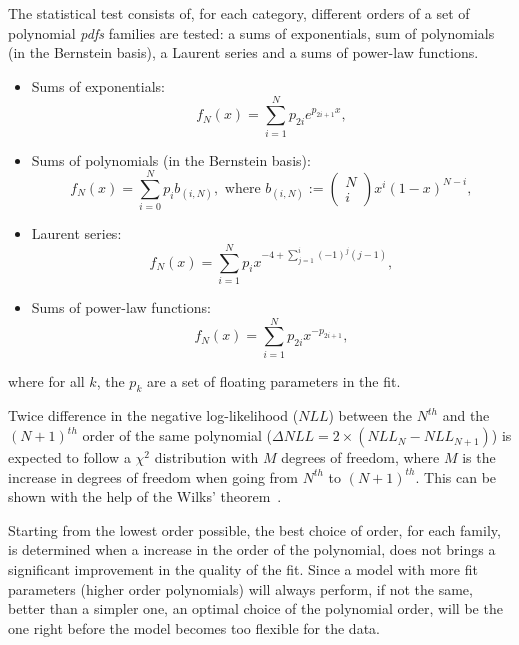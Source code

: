 The statistical test consists of, for each category, different orders of a set of polynomial \textit{pdfs} families are tested: a sums of exponentials, sum of polynomials (in the Bernstein basis), a Laurent series and a sums of power-law functions. 


\begin{itemize}
\item Sums of exponentials: $$ f_{N}(x)= \sum^{N}_{i=1} p_{2i} e^{p_{2i+1} x} ,$$
\item Sums of polynomials (in the Bernstein basis): $$ f_{N}(x) = \sum^{N}_{i=0} p_{i} b_{(i,N)}, \text{ where } b_{(i,N)}:= \begin{pmatrix} N \\ i \end{pmatrix} x^i (1-x)^{N-i} ,$$
\item Laurent series: $$ f_{N}(x)= \sum^{N}_{i=1} p_{i} x^{-4 + \sum^{i}_{j=1} (-1)^{j} (j-1)},$$
\item Sums of power-law functions: $$ f_{N}(x)= \sum^{N}_{i=1} p_{2i} x^{-p_{2i+1}},$$
\end{itemize}
where for all $k$, the $p_k$ are a set of floating parameters in the fit.

Twice difference in the negative log-likelihood ($NLL$) between the $N^{th}$ and the $(N+1)^{th}$ order of the same polynomial ($\Delta NLL = 2 \times (NLL_{N} - NLL_{N+1})$) is expected to follow a $\chi^2$ distribution with $M$ degrees of freedom, where $M$ is the increase in degrees of freedom when going from $N^{th}$ to $(N+1)^{th}$. This can be shown with the help of the Wilks' theorem~\cite{wilks1938}. 


Starting from the lowest order possible, the best choice of order, for each family, is determined when a increase in the order of the polynomial, does not brings a significant improvement in the quality of the fit. Since a model with more fit parameters (higher order polynomials) will always perform, if not the same, better than a simpler one, an optimal choice of the polynomial order, will be the one right before the model becomes too flexible for the data.

